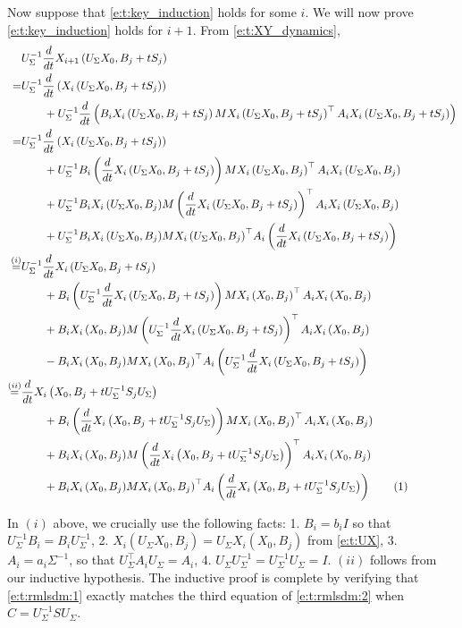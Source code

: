 \documentclass{article}
\newcommand*\lrp[1]{\left( #1 \right)}
\newcommand\numberthis{\addtocounter{equation}{1}\tag{\theequation}}
\newcommand{\US}{U_\Sigma}
\begin{document}
Now suppose that \eqref{e:t:key_induction} holds for some $i$. We will now prove \eqref{e:t:key_induction} holds for $i+1$. From \eqref{e:t:XY_dynamics},
{\allowdisplaybreaks
\begin{align*}
& \US^{-1} \frac{d}{dt} X_{i+1} \lrp{\US X_0, B_j + t S_j}\\
=& \US^{-1}\frac{d}{dt} \lrp{X_i\lrp{\US X_0, B_j + t S_j}}\\
&\qquad + \US^{-1} \frac{d}{dt}\lrp{B_i X_i\lrp{\US X_0, B_j + t S_j} M X_i\lrp{\US X_0, B_j + t S_j}^\top A_i X_i\lrp{\US X_0, B_j + t S_j}}\\
=& \US^{-1}\frac{d}{dt} \lrp{X_i\lrp{\US X_0, B_j + t S_j}}\\
&\qquad + \US^{-1} B_i \lrp{\frac{d}{dt}X_i\lrp{\US X_0, B_j + t S_j}} M X_i\lrp{\US X_0, B_j}^{\top} A_i X_i\lrp{\US X_0, B_j}\\
&\qquad + \US^{-1} B_i {X_i\lrp{\US X_0, B_j}} M \lrp{\frac{d}{dt}X_i\lrp{\US X_0, B_j + t S_j}}^{\top} A_i X_i\lrp{\US X_0, B_j}\\
&\qquad + \US^{-1} B_i {X_i\lrp{\US X_0, B_j}} M {X_i\lrp{\US X_0, B_j}}^{\top} A_i \lrp{\frac{d}{dt}X_i\lrp{\US X_0, B_j + t S_j}}\\
\overset{(i)}{=}&\US^{-1}\frac{d}{dt} {X_i\lrp{\US X_0, B_j + t S_j}}\\
&\qquad + B_i \lrp{\US^{-1}\frac{d}{dt}X_i\lrp{\US X_0, B_j + t S_j}} M X_i\lrp{X_0, B_j}^{\top} A_i X_i\lrp{X_0, B_j}\\
&\qquad + B_i {X_i\lrp{X_0, B_j}} M \lrp{\US^{-1} \frac{d}{dt}X_i\lrp{\US X_0, B_j + t S_j}}^{\top} A_i X_i\lrp{X_0, B_j}\\
&\qquad - B_i {X_i\lrp{X_0, B_j}} M {X_i\lrp{X_0, B_j}}^{\top} A_i \lrp{\US^{-1} \frac{d}{dt}X_i\lrp{\US X_0, B_j + t S_j}}\\
\overset{(ii)}{=}&\frac{d}{dt} {X_i\lrp{X_0, B_j + t \US^{-1} S_j \US}}\\
&\qquad + B_i \lrp{\frac{d}{dt}X_i\lrp{ X_0, B_j + t \US^{-1} S_j \US}} M X_i\lrp{X_0, B_j}^{\top} A_i X_i\lrp{X_0, B_j}\\
&\qquad + B_i {X_i\lrp{X_0, B_j}} M \lrp{\frac{d}{dt}X_i\lrp{ X_0, B_j + t \US^{-1} S_j \US}}^{\top} A_i X_i\lrp{X_0, B_j}\\
&\qquad + B_i {X_i\lrp{X_0, B_j}} M {X_i\lrp{X_0, B_j}}^{\top} A_i \lrp{\frac{d}{dt}X_i\lrp{ X_0, B_j + t \US^{-1} S_j \US}}
\numberthis \label{e:t:rmlsdm:1}
\end{align*}
}

In $(i)$ above, we crucially use the following facts: 1. $B_i = b_i I$ so that $\US^{-1} B_i = B_i \US^{-1}$, 2. $X_i(\US X_0, B_j) = \US X_i(X_0, B_j)$ from \eqref{e:t:UX}, 3. $A_i = a_i \Sigma^{-1}$, so that $\US^{\top} A_i \US = A_i$, 4. $\US\US^{-1} = \US^{-1} \US = I$. $(ii)$ follows from our inductive hypothesis. The inductive proof is complete by verifying that \eqref{e:t:rmlsdm:1} exactly matches the third equation of \eqref{e:t:rmlsdm:2} when $C = \US^{-1} S \US$.
\end{document}
